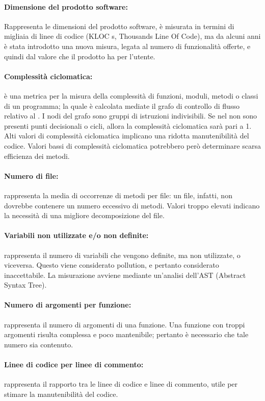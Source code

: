 \paragraph{Dimensione del prodotto software:} Rappresenta le dimensioni del prodotto software, è misurata in termini di migliaia di linee di codice (KLOC s, Thousands Line Of Code), ma da alcuni anni è stata introdotto una nuova misura, legata al numero di funzionalità offerte, e quindi dal valore che il prodotto ha per l’utente.

\paragraph{Complessità ciclomatica:} è una metrica per la misura della complessità di funzioni, moduli, metodi o classi di un programma; la quale è calcolata mediate il grafo di controllo di flusso relativo al .
            I nodi del grafo sono gruppi di istruzioni indivisibili. Se nel  non sono presenti punti decisionali o cicli, allora la complessità ciclomatica sarà pari a 1.
            Alti valori di complessità ciclomatica implicano una ridotta manutenibilità del codice. Valori bassi di complessità ciclomatica potrebbero però determinare scarsa efficienza dei metodi.
            
\paragraph{Numero di file:} rappresenta la media di occorrenze di metodi per file: un file, infatti, non dovrebbe contenere un numero eccessivo di metodi. Valori troppo elevati indicano la necessità di una migliore decomposizione del file.

\paragraph{Variabili non utilizzate e/o non definite:} rappresenta il numero di variabili che vengono definite, ma non utilizzate, o viceversa. Questo viene considerato pollution, e pertanto considerato inaccettabile. La misurazione avviene mediante un’analisi dell’AST (Abstract Syntax Tree).

\paragraph{Numero di argomenti per funzione:} rappresenta il numero di argomenti di una funzione. Una funzione con troppi argomenti risulta complessa e poco mantenibile; pertanto è necessario che tale numero sia contenuto.

\paragraph{Linee di codice per linee di commento:} rappresenta il rapporto tra le linee di codice e linee di commento, utile per stimare la manutenibilità del codice.